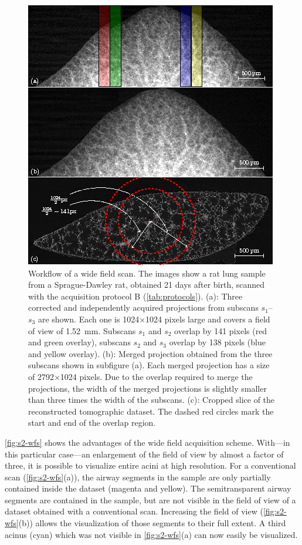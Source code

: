 \begin{figure}
	\centering
	\includegraphics[width=\linewidth]{img/Haberthuer2010/Fig04-Workflow}
	\caption[Workflow of a wide field scan]{Workflow of a wide field scan. The images show a rat lung sample from a Sprague-Dawley rat, obtained 21 days after birth, scanned with the acquisition protocol B (\autoref{tab:protocols}). %
			(a): Three corrected and independently acquired projections from subscans $s_1$--$s_3$ are shown. Each one is 1024\(\times\)1024 pixels large and covers a field of view of \SI{1.52}{\milli\meter}. Subscans $s_1$ and $s_2$ overlap by 141 pixels (red and green overlay), subscans $s_2$ and $s_3$ overlap by 138 pixels (blue and yellow overlay). %
			(b): Merged projection obtained from the three subscans shown in subfigure (a). Each merged projection has a size of 2792\(\times\)1024 pixels. Due to the overlap required to merge the projections, the width of the merged projections is slightly smaller than three times the width of the subscans. %
			(c): Cropped slice of the reconstructed tomographic dataset. The dashed red circles mark the start and end of the overlap region.}
	\label{fig:wide-field-scan-results}
\end{figure}

\autoref{fig:s2-wfs} shows the advantages of the wide field acquisition scheme. With---in this particular case---an enlargement of the field of view by almost a factor of three, it is possible to visualize entire acini at high resolution. For a conventional scan (\autoref{fig:s2-wfs}(a)), the airway segments in the sample are only partially contained inside the dataset (magenta and yellow). The semitransparent airway segments are contained in the sample, but are not visible in the field of view of a dataset obtained with a conventional scan. Increasing the field of view (\autoref{fig:s2-wfs}(b)) allows the visualization of those segments to their full extent. A third acinus (cyan) which was not visible in \autoref{fig:s2-wfs}(a) can now easily be visualized.

